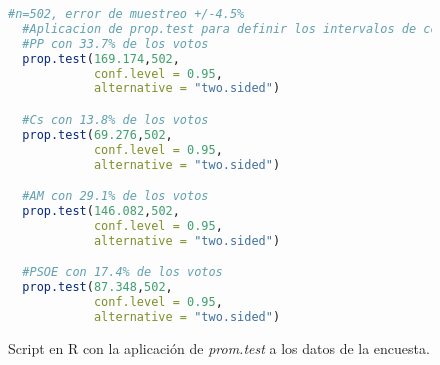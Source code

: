 \documentclass[11pt,a4paper]{article}
\begin{document}
\begin{figure}
\centering
\begin{lstlisting}[language=R]
  #n=502, error de muestreo +/-4.5%
  #Aplicacion de prop.test para definir los intervalos de confianza
  #PP con 33.7% de los votos
  prop.test(169.174,502,
            conf.level = 0.95,
            alternative = "two.sided")

  #Cs con 13.8% de los votos
  prop.test(69.276,502,
            conf.level = 0.95,
            alternative = "two.sided")

  #AM con 29.1% de los votos
  prop.test(146.082,502,
            conf.level = 0.95,
            alternative = "two.sided")

  #PSOE con 17.4% de los votos
  prop.test(87.348,502,
    	    conf.level = 0.95,
            alternative = "two.sided")
\end{lstlisting}
\caption{Script en R con la aplicación de \textit{prom.test} a los datos de la encuesta.}
\label{fig:promtest}
\end{figure}
\end{document}

